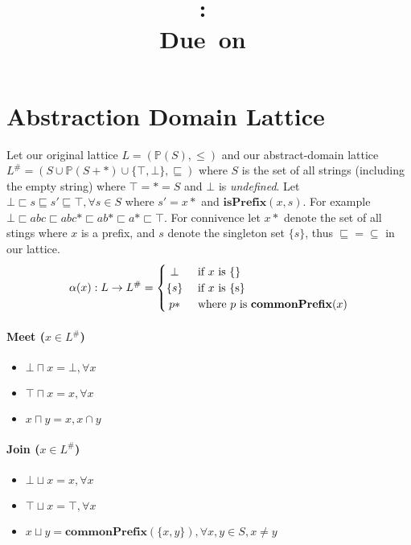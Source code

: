 \documentclass{article}
\title{
\vspace{2in}
\textmd{\textbf{\hmwkClass:\ \hmwkTitle}}\\
\normalsize\vspace{0.1in}\small{Due\ on\ \hmwkDueDate}\\
\vspace{0.1in}\large{\textit{\hmwkClassInstructor}}
\vspace{3in}
}
\author{\textbf{\hmwkAuthorName}}
\date{} %
\newcommand{\powerset}[1]{\mathbb{P}(#1)}
\begin{document}
\maketitle
\newpage



\section{Abstraction Domain Lattice}
Let our original lattice $L = (\powerset{S}, \leq)$ and our abstract-domain lattice $L^\# = (S \cup \powerset{S+*} \cup \{ \top,\bot \},\sqsubseteq)$ where $S$ is the set of all strings (including the empty string) where $\top = * = S$ and $\bot$ is \emph{undefined}. Let $\bot \sqsubset s \sqsubseteq s' \sqsubseteq \top, \forall s \in S$ where $s' = x*$ and $\mathbf{isPrefix}(x,s)$. For example $ \bot \sqsubset abc  \sqsubset abc* \sqsubset ab* \sqsubset a* \sqsubset \top$. For connivence let $x*$ denote the set of all stings where $x$ is a prefix, and $s$ denote the singleton set $\{s\}$, thus $\sqsubseteq = \subseteq$ in our lattice.
\[
 \alpha(x): L \rightarrow L^\# =
  \begin{cases} 
      \hfill \bot    \hfill & \text{ if $x$ is \{\}} \\
      \hfill \{s\} \hfill & \text{ if $x$ is \{s\}} \\
      \hfill p* \hfill & \text{ where $p$ is $\mathbf{commonPrefix}(x)$} \\
  \end{cases}
\]

\paragraph{Meet ($x \in L^\#$)}
\begin{itemize}
	\item $\bot \sqcap x = \bot, \forall x$
	\item $\top \sqcap x = x, \forall x$
	\item $x \sqcap y = x, x\cap y$
\end{itemize}
\paragraph{Join ($x \in L^\#$)}
\begin{itemize}
	\item $\bot \sqcup x = x, \forall x$
	\item $\top \sqcup x = \top, \forall x$
	\item $x \sqcup y = \mathbf{commonPrefix}(\{x,y\}), \forall x,y \in S, x \neq y$
\end{itemize}
\end{document}
